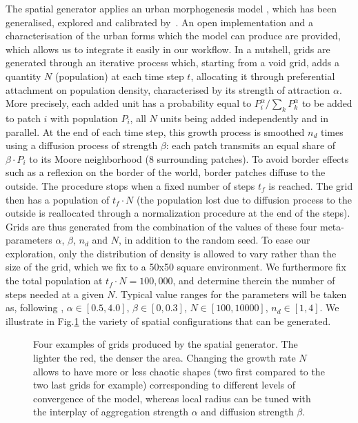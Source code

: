 \documentclass[3p,times,procedia]{elsarticle}
\begin{document}
The spatial generator applies an urban morphogenesis model \citep{Batty2007}, which has been generalised, explored and calibrated by~\citet{2017arXiv170806743R}. An open implementation and a characterisation of the urban forms which the model can produce are provided, which allows us to integrate it easily in our workflow. In a nutshell, grids are generated through an iterative process which, starting from a void grid, adds a quantity $N$ (population) at each time step $t$, allocating it through preferential attachment on population density, characterised by its strength of attraction $\alpha$. More precisely, each added unit has a probability equal to $P_i^{\alpha}/\sum_k P_k^{\alpha}$ to be added to patch $i$ with population $P_i$, all $N$ units being added independently and in parallel. At the end of each time step, this growth process is smoothed $n_d$ times using a diffusion process of strength $\beta$: each patch transmits an equal share of $\beta\cdot P_i$ to its Moore neighborhood (8 surrounding patches). To avoid border effects such as a reflexion on the border of the world, border patches diffuse to the outside. The procedure stops when a fixed number of steps $t_f$ is reached. The grid then has a population of $t_f \cdot N$ (the population lost due to diffusion process to the outside is reallocated through a normalization procedure at the end of the steps). Grids are thus generated from the combination of the values of these four meta-parameters $\alpha$, $\beta$, $n_d$ and $N$, in addition to the random seed. To ease our exploration, only the distribution of density is allowed to vary rather than the size of the grid, which we fix to a 50x50 square environment. We furthermore fix the total population at $t_f\cdot N = 100,000$, and determine therein the number of steps needed at a given $N$. Typical value ranges for the  parameters will be taken as, following \citet{2017arXiv170806743R}, $\alpha\in\left[0.5,4.0\right]$, $\beta \in\left[0,0.3\right] $, $N\in \left[100,10000\right]$, $n_d\in\left[1,4\right]$. We illustrate in Fig.\ref{fig:spatialGen} the variety of spatial configurations that can be generated.

\begin{figure}[htbp] \begin{center} 
 \caption{Four examples of grids produced by the spatial generator. The lighter the red, the denser the area. Changing the growth rate $N$ allows to have more or less chaotic shapes (two first compared to the two last grids for example) corresponding to different levels of convergence of the model, whereas local radius can be tuned with the interplay of aggregation strength $\alpha$ and diffusion strength $\beta$.} \label{fig:spatialGen} \end{center} \end{figure} %
\end{document}

